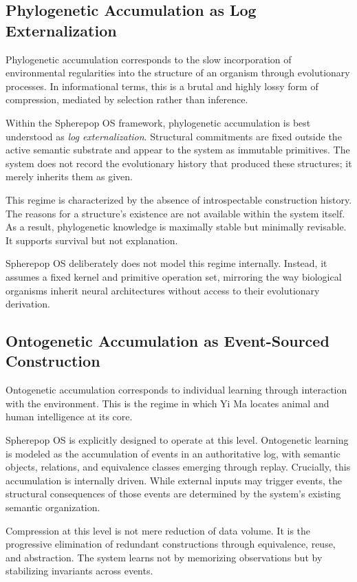\documentclass[11pt]{article}
\begin{document}
\subsection{Phylogenetic Accumulation as Log Externalization}

Phylogenetic accumulation corresponds to the slow incorporation of
environmental regularities into the structure of an organism through
evolutionary processes. In informational terms, this is a brutal and highly
lossy form of compression, mediated by selection rather than inference.

Within the Spherepop OS framework, phylogenetic accumulation is best
understood as \emph{log externalization}. Structural commitments are fixed
outside the active semantic substrate and appear to the system as immutable
primitives. The system does not record the evolutionary history that produced
these structures; it merely inherits them as given.

This regime is characterized by the absence of introspectable construction
history. The reasons for a structure’s existence are not available within
the system itself. As a result, phylogenetic knowledge is maximally stable
but minimally revisable. It supports survival but not explanation.

Spherepop OS deliberately does not model this regime internally. Instead, it
assumes a fixed kernel and primitive operation set, mirroring the way
biological organisms inherit neural architectures without access to their
evolutionary derivation.

\subsection{Ontogenetic Accumulation as Event-Sourced Construction}

Ontogenetic accumulation corresponds to individual learning through
interaction with the environment. This is the regime in which Yi Ma locates
animal and human intelligence at its core.

Spherepop OS is explicitly designed to operate at this level. Ontogenetic
learning is modeled as the accumulation of events in an authoritative log,
with semantic objects, relations, and equivalence classes emerging through
replay. Crucially, this accumulation is internally driven. While external
inputs may trigger events, the structural consequences of those events are
determined by the system’s existing semantic organization.

Compression at this level is not mere reduction of data volume. It is the
progressive elimination of redundant constructions through equivalence,
reuse, and abstraction. The system learns not by memorizing observations but
by stabilizing invariants across events.
\end{document}
